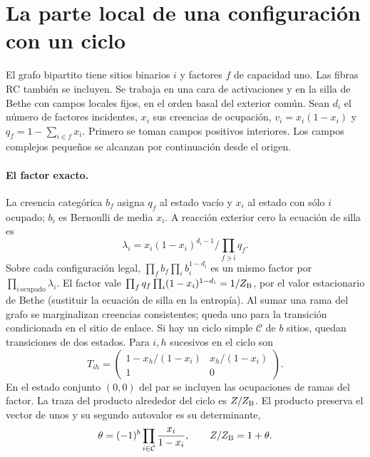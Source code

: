 \section{La parte local de una configuración con un ciclo}
El grafo bipartito tiene sitios binarios $i$ y factores $f$ de capacidad uno.
Las fibras RC también se incluyen. Se trabaja en una cara de activaciones y en la
silla de Bethe con campos locales fijos, en el orden basal del exterior común.
Sean $d_i$ el número de factores incidentes, $x_i$ sus creencias de ocupación,
$v_i=x_i(1-x_i)$ y $q_f=1-\sum_{i\in f}x_i$. Primero se toman campos positivos
interiores. Los campos complejos pequeños se alcanzan por continuación desde el origen.

\paragraph{El factor exacto.}
La creencia categórica $b_f$ asigna $q_f$ al estado vacío y $x_i$ al estado
con sólo $i$ ocupado; $b_i$ es Bernoulli de media $x_i$. A reacción exterior cero
la ecuación de silla es
\[
 \lambda_i=x_i(1-x_i)^{d_i-1}/\prod_{f\ni i}q_f .
\]
Sobre cada configuración legal, $\prod_f b_f\prod_i b_i^{1-d_i}$ es un mismo
factor por $\prod_{i\,\text{ocupado}}\lambda_i$. El factor vale
$\prod_f q_f\prod_i(1-x_i)^{1-d_i}=1/Z_{\rm B}$, por el valor
estacionario de Bethe (sustituir la ecuación de silla en la entropía).
Al sumar una rama del grafo se marginalizan creencias consistentes; queda uno
para la transición condicionada en el sitio de enlace. Si hay un ciclo simple
$\mathcal C$ de $b$ sitios, quedan transiciones de dos estados. Para $i,h$
sucesivos en el ciclo son
\[
 T_{ih}=\begin{pmatrix}
  1-x_h/(1-x_i)&x_h/(1-x_i)\\1&0
 \end{pmatrix}.
\]
En el estado conjunto $(0,0)$ del par se incluyen las ocupaciones de ramas del factor.
La traza del producto alrededor del ciclo es $Z/Z_{\rm B}$.
El producto preserva el vector de unos y su segundo autovalor es su determinante,
\[
 \theta=(-1)^b\prod_{i\in\mathcal C}\frac{x_i}{1-x_i},\qquad Z/Z_{\rm B}=1+\theta .
\]

